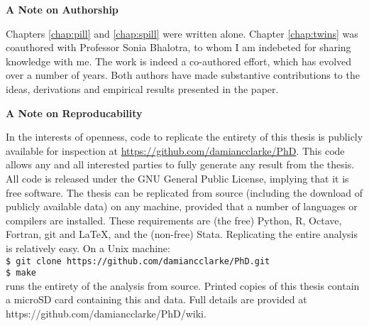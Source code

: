 \begin{center}
\textbf{A Note on Authorship}
\end{center}

Chapters \ref{chap:pill} and \ref{chap:spill} were written alone.  Chapter 
\ref{chap:twins} was coauthored with Professor Sonia Bhalotra, to whom I am 
indebeted for sharing knowledge with me.  The work is indeed a co-authored 
effort, which has evolved over a number of years.  Both authors have made 
substantive contributions to the ideas, derivations and empirical results
presented in the paper.
\vspace{1cm}

\begin{center}
\textbf{A Note on Reproducability}
\end{center}

\noindent In the interests of openness, code to replicate the entirety of this 
thesis is publicly available for inspection at 
\href{https://github.com/damiancclarke/PhD}{https://github.com/damiancclarke/PhD}. 
This code allows any and all interested 
parties to fully generate any result from the thesis.  All code is released 
under the GNU General Public License, implying that it is free software.  The 
thesis can be replicated from source (including the download of publicly 
available data) on any machine, provided that a number of languages or compilers 
are installed.  These requirements are (the free) Python, R, Octave, Fortran, 
git and LaTeX, and the (non-free) Stata.  Replicating the entire analysis is 
relatively easy.  On a Unix machine: 
\vspace{1mm} \\
\indent\texttt{\$ git clone https://github.com/damiancclarke/PhD.git}\\
\indent\texttt{\$ make}
\vspace{1mm} \\
runs the entirety of the analysis from source.  Printed copies of this thesis
contain a microSD card containing this and data.  Full details are provided at
https://github.com/damiancclarke/PhD/wiki.


